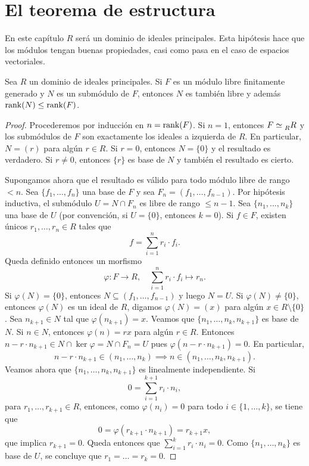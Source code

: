 \chapter{El teorema de estructura}

En este capítulo $R$ será un dominio de ideales principales. Esta hipótesis hace
que los módulos tengan buenas propiedades, casi como pasa en el caso de espacios vectoriales.

\begin{theorem}
\label{thm:rango}
Sea $R$ un dominio de ideales principales. Si $F$ es un módulo libre finitamente generado 
y $N$ es un submódulo de $F$, entonces $N$ es también libre y además 
$\operatorname{rank}(N)\leq\operatorname{rank}(F)$. 
\end{theorem}

\begin{proof}
	Procederemos por inducción en $n=\operatorname{rank}(F)$. Si $n=1$, entonces
	$F\simeq\prescript{}{R}R$ 
	y los submódulos de $F$ son exactamente los ideales a izquierda de $R$. En particular,
	$N=(r)$ para algún $r\in R$. Si $r=0$, entonces $N=\{0\}$ y el resultado es verdadero. Si $r\ne 0$, entonces $\{r\}$ es base de $N$ y también el resultado es cierto. 
	
	Supongamos ahora que el resultado es válido para todo módulo libre de rango $<n$. 
	Sea $\{f_1,\dots,f_n\}$ una
	base de $F$ y sea $F_n=(f_1,\dots,f_{n-1})$. Por hipótesis inductiva, 
	el submódulo $U=N\cap F_n$ es libre de rango $\leq n-1$. Sea
	$\{n_1,\dots,n_k\}$ una base de $U$ (por convención, si $U=\{0\}$, entonces $k=0$). Si $f\in F$, existen únicos $r_1,\dots,r_n\in R$ tales que 
	\[
	f=\sum_{i=1}^n r_i\cdot f_i.
	\]
	Queda definido 
	entonces un morfismo 
	\[
	\varphi\colon F\to R,
	\quad
	\sum_{i=1}^nr_i\cdot f_i\mapsto r_n.
	\] 
	Si $\varphi(N)=\{0\}$, entonces $N\subseteq (f_1,\dots,f_{n-1})$ y luego $N=U$. 
	Si $\varphi(N)\ne\{0\}$, entonces $\varphi(N)$ es un ideal
	de $R$, digamos $\varphi(N)=(x)$ para algún $x\in R\setminus\{0\}$. Sea $n_{k+1}\in N$ 
	tal que $\varphi(n_{k+1})=x$. 
	Veamos que $\{n_1,\dots,n_k,n_{k+1}\}$ es base de $N$. 
	Si $n\in N$, entonces $\varphi(n)=rx$ 
	para algún $r\in R$. Entonces $n-r\cdot n_{k+1}\in N\cap\ker\varphi=N\cap F_n=U$ pues 
	$\varphi(n-r\cdot n_{k+1})=0$. En particular, 
	\[
	n-r\cdot n_{k+1}\in (n_1,\dots,n_k)\implies  
	n\in (n_1,\dots,n_k,n_{k+1}).
	\]
	Veamos ahora que
	$\{n_1,\dots,n_k,n_{k+1}\}$ es linealmente independiente. Si 
	\[
	0=\sum_{i=1}^{k+1}r_i\cdot n_i,
	\]
	para $r_1,\dots,r_{k+1}\in R$, entonces, como $\varphi(n_i)=0$ para todo $i\in\{1,\dots,k\}$, se tiene que 
	\[
	0=\varphi(r_{k+1}\cdot n_{k+1})=r_{k+1}x,
	\]
	que implica $r_{k+1}=0$. Queda entonces que $\sum_{i=1}^kr_i\cdot n_i=0$. Como $\{n_1,\dots,n_k\}$ es base de $U$, se concluye que
	$r_1=\dots=r_k=0$. 
\end{proof}

